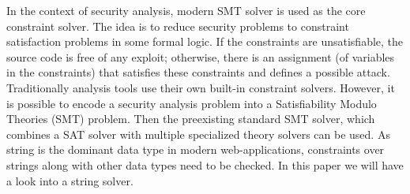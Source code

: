 In the context of security analysis, modern SMT solver is used as the core constraint solver. The idea is to reduce security problems to constraint satisfaction problems in some formal logic. If the constraints are unsatisfiable, the source code is free of any exploit; otherwise, there is an assignment (of variables in the constraints) that satisfies these constraints and defines a possible attack. Traditionally analysis tools use their own built-in constraint solvers. However, it is possible to encode a security analysis problem into a Satisfiability Modulo Theories (SMT) problem. Then the preexisting standard SMT solver, which combines a SAT solver with multiple specialized theory solvers can be used. As string is the dominant data type in modern web-applications, constraints over strings along with other data types need to be checked. In this paper we will have a look into a string solver.